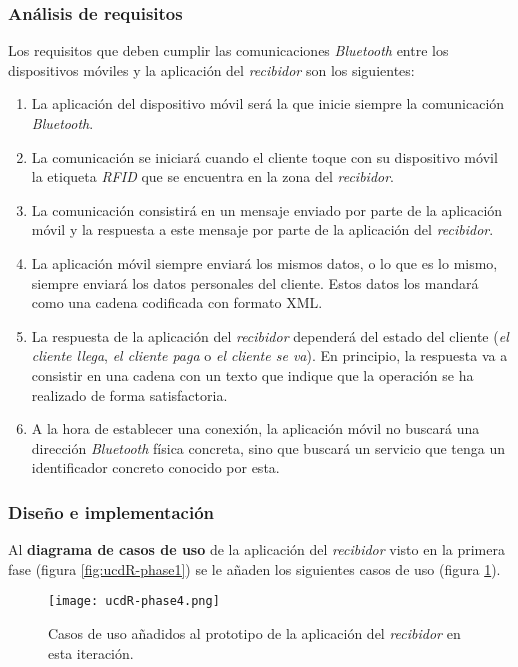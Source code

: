 \subsubsection{Análisis de requisitos}
Los requisitos que deben cumplir las comunicaciones \emph{Bluetooth} entre
los dispositivos móviles y la aplicación del \emph{recibidor} son los
siguientes:
\begin{enumerate}
\item La aplicación del dispositivo móvil será la que inicie siempre la
comunicación \emph{Bluetooth}.
\item La comunicación se iniciará cuando el cliente toque con su dispositivo
móvil la etiqueta \emph{RFID} que se encuentra en la zona del \emph{recibidor}.
\item La comunicación consistirá en un mensaje enviado por parte de la
aplicación móvil y la respuesta a este mensaje por parte de la aplicación
del \emph{recibidor}.
\item La aplicación móvil siempre enviará los mismos datos, o lo que es lo
mismo, siempre enviará los datos personales del cliente. Estos datos los
mandará como una cadena codificada con formato \acs{XML}.
\item La respuesta de la aplicación del \emph{recibidor} dependerá del estado
del cliente (\emph{el cliente llega}, \emph{el cliente paga} o \emph{el cliente
se va}). En principio, la respuesta va a consistir en una cadena con un texto
que indique que la operación se ha realizado de forma satisfactoria.
\item A la hora de establecer una conexión, la aplicación móvil no buscará una
dirección \emph{Bluetooth} física concreta, sino que buscará un servicio que
tenga un identificador concreto conocido por esta.
\end{enumerate}

\subsubsection{Diseño e implementación}
Al \textbf{diagrama de casos de uso} de la aplicación del \emph{recibidor}
visto en la primera fase (figura \ref{fig:ucdR-phase1}) se le añaden los
siguientes casos de uso (figura \ref{fig:ucdR-phase4}).

  \begin{figure}[H]
    \begin{center}
      \texttt{[image: ucdR-phase4.png]}
      \caption{Casos de uso añadidos al prototipo de la aplicación
      del \emph{recibidor} en esta iteración.}
      \label{fig:ucdR-phase4}
    \end{center}
  \end{figure}

